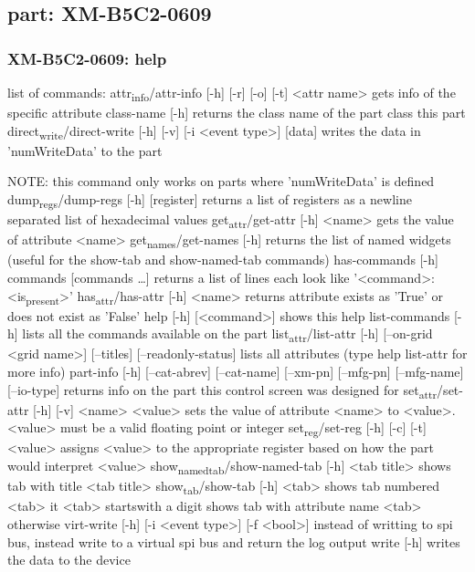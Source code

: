 \documentclass[11pt]{article}
\begin{document}
\subsection{part: XM-B5C2-0609}
\label{sec:org3837e02}
\subsubsection{XM-B5C2-0609: help}
\label{sec:org9a11222}
list of commands:
  attr\textsubscript{info}/attr-info [-h] [-r] [-o] [-t] <attr name>
    gets info of the specific attribute
  class-name [-h]
    returns the class name of the part class this part
  direct\textsubscript{write}/direct-write [-h] [-v] [-i <event type>] [data]
    writes the data in 'numWriteData' to the part

  NOTE: this command only works on parts where 'numWriteData' is defined
dump\textsubscript{regs}/dump-regs [-h] [register]
  returns a list of registers as a newline separated list of hexadecimal values
get\textsubscript{attr}/get-attr [-h] <name>
  gets the value of attribute <name>
get\textsubscript{names}/get-names [-h]
  returns the list of named widgets (useful for the show-tab and show-named-tab commands)
has-commands [-h] commands [commands \ldots{}]
  returns a list of lines each look like '<command>: <is\textsubscript{present}>'
has\textsubscript{attr}/has-attr [-h] <name>
  returns attribute exists as 'True' or does not exist as 'False'
help [-h] [<command>]
  shows this help
list-commands [-h]
  lists all the commands available on the part
list\textsubscript{attr}/list-attr [-h] [--on-grid <grid name>] [--titles] [--readonly-status]
  lists all attributes (type help list-attr for more info)
part-info  [-h] [--cat-abrev] [--cat-name] [--xm-pn] [--mfg-pn] [--mfg-name]
	[--io-type]
  returns info on the part this control screen was designed for
set\textsubscript{attr}/set-attr [-h] [-v] <name> <value>
  sets the value of attribute <name> to <value>.
  <value> must be a valid floating point or integer
set\textsubscript{reg}/set-reg [-h] [-c] [-t] <value>
  assigns <value> to the appropriate register based on how the part would interpret <value>
show\textsubscript{named}\textsubscript{tab}/show-named-tab [-h] <tab title>
  shows tab with title <tab title>
show\textsubscript{tab}/show-tab [-h] <tab>
  shows tab numbered <tab> it <tab> startswith a digit
  shows tab with attribute name <tab> otherwise
virt-write [-h] [-i <event type>] [-f <bool>]
  instead of writting to spi bus, instead write to a virtual spi bus
  and return the log output
write [-h]
  writes the data to the device
\end{document}
